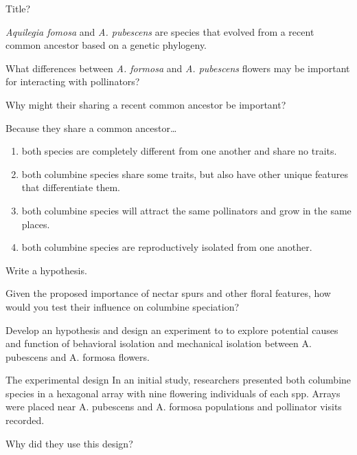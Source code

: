 \documentclass[t,hidelinks]{beamer}
\newcommand{\ques}[1]{\highlight{\textsc{q#1:}}}
\begin{document}
%
\begin{frame}[t]{Title?}
	
	\hangpara \textit{Aquilegia fomosa} and \textit{A. pubescens} are species that evolved from a recent common ancestor based on a genetic phylogeny. 
	
	\hangpara What differences between \textit{A. formosa} and \textit{A. pubescens} flowers may be important for interacting with pollinators?
	
	\hangpara Why might their sharing a recent common ancestor be important?

\end{frame}
%
\begin{frame}[t]{\ques8 Because they share a common ancestor\dots}
	
	\begin{enumerate}
		\item both species are completely different from one another and share no traits. 
		
		\item both columbine species share some traits, but also have other unique features that differentiate them.
		
		\item both columbine species will attract the same pollinators and grow in the same places.
		
		\item both columbine species are reproductively isolated from one another.
	\end{enumerate}
\end{frame}
%
\begin{frame}[t]{Write a hypothesis.}
	
	\hangpara Given the proposed importance of nectar spurs and other floral features, how would you test their influence on columbine speciation?

	\hangpara Develop an hypothesis and design an experiment to  to explore potential causes and function of behavioral isolation and mechanical isolation between A. pubescens and A. formosa flowers.

\end{frame}
%
\begin{frame}[t]{The experimental design}
	\hangpara In an initial study, researchers presented both columbine species in a hexagonal array with nine flowering individuals of each spp. Arrays were placed near A. pubescens and A. formosa populations and pollinator visits recorded.
	
	\hangpara Why did they use this design?
\end{frame}
\end{document}
